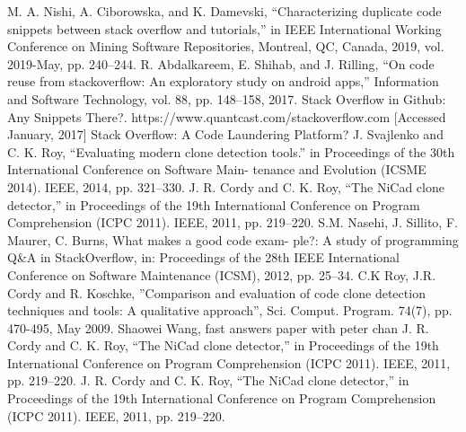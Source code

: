 \documentclass[conference]{IEEEtran}
\begin{document}
	\begin{thebibliography}{00}
		 M. A. Nishi, A. Ciborowska, and K. Damevski, “Characterizing duplicate code snippets between stack overflow and tutorials,” in IEEE International Working Conference on Mining Software Repositories, Montreal, QC, Canada, 2019, vol. 2019-May, pp. 240–244.
		 R. Abdalkareem, E. Shihab, and J. Rilling, “On code reuse from stackoverflow: An exploratory study on android apps,” Information and Software Technology, vol. 88, pp. 148–158, 2017.
		 Stack Overflow in Github: Any Snippets There?.
		 https://www.quantcast.com/stackoverflow.com [Accessed January, 2017]
		 Stack Overflow: A Code Laundering Platform?
		 J. Svajlenko and C. K. Roy, “Evaluating modern clone detection tools.” in Proceedings of the 30th International Conference on Software Main- tenance and Evolution (ICSME 2014). IEEE, 2014, pp. 321–330.
		 J. R. Cordy and C. K. Roy, “The NiCad clone detector,” in Proceedings of the 19th International Conference on Program Comprehension (ICPC 2011). IEEE, 2011, pp. 219–220.
		 S.M. Nasehi, J. Sillito, F. Maurer, C. Burns, What makes a good code exam- ple?: A study of programming Q\&A in StackOverflow, in: Proceedings of the 28th IEEE International Conference on Software Maintenance (ICSM), 2012, pp. 25–34.
		 C.K Roy, J.R. Cordy and R. Koschke, ”Comparison and evaluation of code clone detection techniques and tools: A qualitative approach”, Sci. Comput. Program. 74(7), pp. 470-495, May 2009.
		 Shaowei Wang, fast answers paper with peter chan
		 J. R. Cordy and C. K. Roy, “The NiCad clone detector,” in Proceedings of the 19th International Conference on Program Comprehension (ICPC 2011). IEEE, 2011, pp. 219–220.
		 J. R. Cordy and C. K. Roy, “The NiCad clone detector,” in Proceedings of the 19th International Conference on Program Comprehension (ICPC 2011). IEEE, 2011, pp. 219–220.
		
	\end{thebibliography}
	
	
\end{document}
